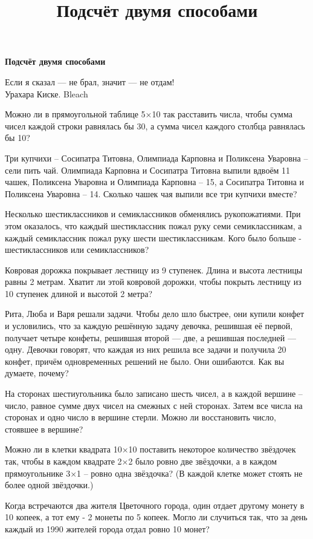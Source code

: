 \centerline{\bf \Huge  Подсчёт двумя способами}
\title{Подсчёт двумя способами}

\begin{flushright}
    \scriptsize Если я сказал — не брал, значит — не отдам!\\Урахара Киске. Bleach
\end{flushright}

 Можно ли в прямоугольной таблице 5×10 так расставить числа, чтобы сумма чисел каждой строки равнялась бы 30, а сумма чисел каждого столбца равнялась бы 10?

 Три купчихи – Сосипатра Титовна, Олимпиада Карповна и Поликсена Уваровна – сели пить чай. Олимпиада Карповна и Сосипатра Титовна выпили вдвоём 11 чашек, Поликсена Уваровна и Олимпиада Карповна – 15, а Сосипатра Титовна и Поликсена Уваровна – 14. Сколько чашек чая выпили все три купчихи вместе?

 Несколько шестиклассников и семиклассников обменялись рукопожатиями. При этом оказалось, что каждый шестиклассник пожал руку семи семиклассникам, а каждый семиклассник пожал руку шести шестиклассникам. Кого было больше - шестиклассников или семиклассников? 

 Ковровая дорожка покрывает лестницу из 9 ступенек. Длина и высота лестницы равны 2 метрам. Хватит ли этой ковровой дорожки, чтобы покрыть лестницу из 10 ступенек длиной и высотой 2 метра?

 Рита, Люба и Варя решали задачи. Чтобы дело шло быстрее, они купили конфет и условились, что за каждую решённую задачу девочка, решившая её первой, получает четыре конфеты, решившая второй — две, а решившая последней — одну. Девочки говорят, что каждая из них решила все задачи и получила 20 конфет, причём одновременных решений не было. Они ошибаются. Как вы думаете, почему? 

 На сторонах шестиугольника было записано шесть чисел, а в каждой вершине – число, равное сумме двух чисел на смежных с ней сторонах. Затем все числа на сторонах и одно число в вершине стерли. Можно ли восстановить число, стоявшее в вершине? 

 Можно ли в клетки квадрата 10×10 поставить некоторое количество звёздочек так, чтобы в каждом квадрате 2×2 было ровно две звёздочки, а в каждом прямоугольнике 3×1 – ровно одна звёздочка? (В каждой клетке может стоять не более одной звёздочки.)

 Когда встречаются два жителя Цветочного города, один отдает другому монету в 10 копеек, а тот ему - 2 монеты по 5 копеек. Могло ли случиться так, что за день каждый из 1990 жителей города отдал ровно 10 монет?